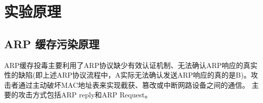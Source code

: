 \section{实验原理}



\subsection{ARP 缓存污染原理}
ARP缓存投毒主要利用了ARP协议缺少有效认证机制、无法确认ARP响应的真实性的缺陷(即上述ARP协议流程中，A实际无法确认发送ARP响应的真的是B)。攻击者通过主动破坏MAC地址表来实现截获、篡改或中断网路设备之间的通信。
主要的攻击方式包括ARP reply和ARP Request。





